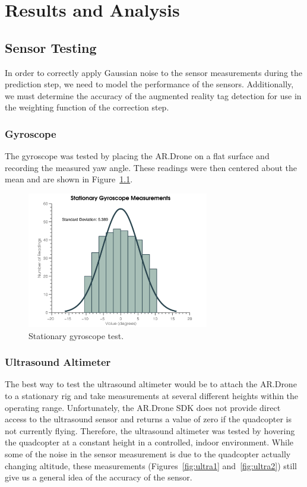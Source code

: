 \chapter{Results and Analysis\label{ch:results}}

\section{Sensor Testing}
	In order to correctly apply Gaussian noise to the sensor measurements during the prediction step, we need to model the performance of the sensors. Additionally, we must determine the accuracy of the augmented reality tag detection for use in the weighting function of the correction step.

	\subsection{Gyroscope}
		The gyroscope was tested by placing the AR.Drone on a flat surface and recording the measured yaw angle. These readings were then centered about the mean and are shown in Figure~\ref{fig:gyr}.

		\begin{figure}[ht]
		        \centering
				\includegraphics[width=300px]{../images/gyr_test.png}
				\caption{Stationary gyroscope test.}\label{fig:gyr}
		\end{figure}

	\subsection{Ultrasound Altimeter}

		The best way to test the ultrasound altimeter would be to attach the AR.Drone to a stationary rig and take measurements at several different heights within the operating range. Unfortunately, the AR.Drone SDK does not provide direct access to the ultrasound sensor and returns a value of zero if the quadcopter is not currently flying. Therefore, the ultrasound altimeter was tested by hovering the quadcopter at a constant height in a controlled, indoor environment. While some of the noise in the sensor measurement is due to the quadcopter actually changing altitude, these measurements (Figures~\ref{fig:ultra1} and~\ref{fig:ultra2}) still give us a general idea of the accuracy of the sensor.

